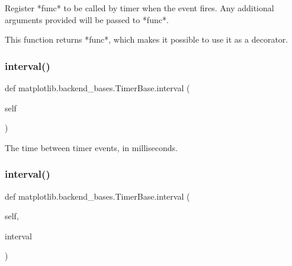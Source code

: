 \begin{DoxyVerb}Register *func* to be called by timer when the event fires. Any
additional arguments provided will be passed to *func*.

This function returns *func*, which makes it possible to use it as a
decorator.
\end{DoxyVerb}
 \mbox{\label{classmatplotlib_1_1backend__bases_1_1TimerBase_a1dee6c43410451f2b0d9e409eda754af}} 
\subsubsection{\texorpdfstring{interval()}{interval()}\hspace{0.1cm}{\footnotesize\ttfamily [1/2]}}
{\footnotesize\ttfamily def matplotlib.\+backend\+\_\+bases.\+Timer\+Base.\+interval (\begin{DoxyParamCaption}\item[{}]{self }\end{DoxyParamCaption})}

\begin{DoxyVerb}The time between timer events, in milliseconds.\end{DoxyVerb}
 \mbox{\label{classmatplotlib_1_1backend__bases_1_1TimerBase_a59501ba97b0422e2e0606c7703f85bf9}} 
\subsubsection{\texorpdfstring{interval()}{interval()}\hspace{0.1cm}{\footnotesize\ttfamily [2/2]}}
{\footnotesize\ttfamily def matplotlib.\+backend\+\_\+bases.\+Timer\+Base.\+interval (\begin{DoxyParamCaption}\item[{}]{self,  }\item[{}]{interval }\end{DoxyParamCaption})}

